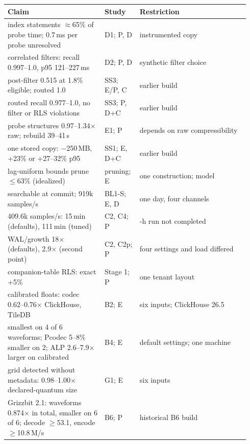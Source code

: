 \documentclass[sigconf]{acmart}
\begin{document}
\medskip\noindent
\begin{longtable}{@{}>{\raggedright\arraybackslash}p{0.38\linewidth}p{0.13\linewidth}>{\raggedright\arraybackslash}p{0.43\linewidth}@{}}
\toprule
Claim & Study & Restriction \\
\midrule\endhead
index statements $\approx$65\% of probe time; 0.7\,ms per probe unresolved & D1; P, D & instrumented copy \\
correlated filters: recall 0.997--1.0, p95 121--227\,ms & D2; P, D & synthetic filter choice \\
post-filter 0.515 at 1.8\% eligible; routed 1.0 & SS3; E/P, C & earlier build \\
routed recall 0.977--1.0, no filter or RLS violations & SS3; P, D+C & earlier build \\
probe structures 0.97--1.34$\times$ raw; rebuild 39--41\,s & E1; P & depends on raw compressibility \\
one stored copy: $-$250\,MB, +23\% or +27--32\% p95 & SS1; E, D+C & earlier build \\
lag-uniform bounds prune $\le$63\% (idealized) & pruning; E & one construction; model \\
searchable at commit; 919k samples/s & BL1-S; E, D & one day, four channels \\
409.6k samples/s: 15\,min (defaults), 111\,min (tuned) & C2, C4; P & 2-h run not completed \\
WAL/growth 18$\times$ (defaults), 2.9$\times$ (second point) & C2, C2p; P & four settings and load differed \\
companion-table RLS: exact +5\% & Stage 1; P & one tenant layout \\
calibrated floats: codec 0.62--0.76$\times$ ClickHouse, TileDB & B2; E & six inputs; ClickHouse 26.5 \\
smallest on 4 of 6 waveforms; Pcodec 5--8\% smaller on 2; ALP 2.6--7.9$\times$ larger on calibrated & B4; E & default settings; one machine \\
grid detected without metadata: 0.98--1.00$\times$ declared-quantum size & G1; E & six inputs \\
Grizzbit 2.1: waveforms 0.874$\times$ in total, smaller on 6 of 6; decode $\geq$53.1, encode $\geq$10.8\,M/s & B6; P & historical B6 build \\
\bottomrule
\end{longtable}
\end{document}
